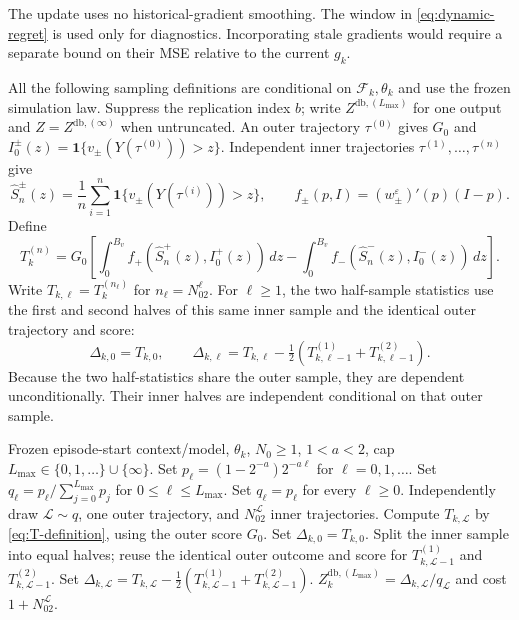 \documentclass[11pt]{article}
\newcommand{\1}{\mathbf 1}
\newcommand{\cF}{\mathcal F}
\newcommand{\CPT}{\ensuremath{\mathrm{CPT}}\xspace}
\newcommand{\eps}{\varepsilon}
\newcommand{\db}{\mathrm{db}}
\begin{document}
The update uses no historical-gradient smoothing. The window in \eqref{eq:dynamic-regret} is used only for diagnostics. Incorporating stale gradients would require a separate bound on their MSE relative to the current $g_k$.

All the following sampling definitions are conditional on $\cF_k,\theta_k$ and use the frozen simulation law. Suppress the replication index $b$; write $Z^{\db,(L_{\max})}$ for one output and $Z=Z^{\db,(\infty)}$ when untruncated. An outer trajectory $\tau^{(0)}$ gives $G_0$ and $I_0^\pm(z)=\1\{v_\pm(Y(\tau^{(0)}))>z\}$. Independent inner trajectories $\tau^{(1)},\ldots,\tau^{(n)}$ give
\begin{equation}\label{eq:empirical-survival}
 \widehat S_n^\pm(z)=\frac1n\sum_{i=1}^n
 \1\{v_\pm(Y(\tau^{(i)}))>z\},\qquad
 f_\pm(p,I)=(w_\pm^\eps)'(p)(I-p).
\end{equation}
Define
\begin{equation}\label{eq:T-definition}
 T_k^{(n)}=G_0\left[\int_0^{B_v}f_+(\widehat S_n^+(z),I_0^+(z))\,dz
 -\int_0^{B_v}f_-(\widehat S_n^-(z),I_0^-(z))\,dz\right].
\end{equation}
Write $T_{k,\ell}=T_k^{(n_\ell)}$ for $n_\ell=N_02^\ell$. For $\ell\ge1$, the two half-sample statistics use the first and second halves of this same inner sample and the identical outer trajectory and score:
\begin{equation}\label{eq:antithetic-delta}
 \Delta_{k,0}=T_{k,0},\qquad
 \Delta_{k,\ell}=T_{k,\ell}-\tfrac12(T_{k,\ell-1}^{(1)}+T_{k,\ell-1}^{(2)}).
\end{equation}
Because the two half-statistics share the outer sample, they are dependent unconditionally. Their inner halves are independent conditional on that outer sample.


\begin{algorithm}[t]
\caption{One multilevel debiased \CPT gradient replication}\label{alg:debiased}
\begin{algorithmic}[1]
\Require Frozen episode-start context/model, $\theta_k$, $N_0\ge1$, $1<a<2$, cap $L_{\max}\in\{0,1,\ldots\}\cup\{\infty\}$.
\State Set $p_\ell=(1-2^{-a})2^{-a\ell}$ for $\ell=0,1,\ldots$.
    \State Set $q_\ell=p_\ell/\sum_{j=0}^{L_{\max}}p_j$ for $0\le\ell\le L_{\max}$.
\Else
    \State Set $q_\ell=p_\ell$ for every $\ell\ge0$.
\EndIf
\State Independently draw $\mathcal L\sim q$, one outer trajectory, and $N_02^{\mathcal L}$ inner trajectories.
\State Compute $T_{k,\mathcal L}$ by \eqref{eq:T-definition}, using the outer score $G_0$.
    \State Set $\Delta_{k,0}=T_{k,0}$.
\Else
    \State Split the inner sample into equal halves; reuse the identical outer outcome and score for $T_{k,\mathcal L-1}^{(1)}$ and $T_{k,\mathcal L-1}^{(2)}$.
    \State Set $\Delta_{k,\mathcal L}=T_{k,\mathcal L}-\tfrac12(T_{k,\mathcal L-1}^{(1)}+T_{k,\mathcal L-1}^{(2)})$.
\EndIf
\State \Return $Z_k^{\db,(L_{\max})}=\Delta_{k,\mathcal L}/q_{\mathcal L}$ and cost $1+N_02^{\mathcal L}$.
\end{algorithmic}
\end{algorithm}
\end{document}
